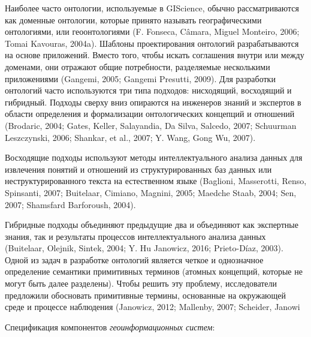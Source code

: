 Наиболее часто онтологии, используемые в GIScience, обычно рассматриваются как доменные онтологии, которые принято называть  географическими онтологиями, или геоонтологиями (F. Fonseca, Câmara,  Miguel Monteiro, 2006; Tomai Kavouras, 2004a). Шаблоны проектирования онтологий разрабатываются на основе приложений. Вместо того, чтобы искать соглашения внутри или между доменами, они отражают общие потребности, разделяемые несколькими приложениями (Gangemi, 2005; Gangemi Presutti, 2009).  
Для разработки онтологий часто используются три типа подходов: нисходящий, восходящий и гибридный. 
Подходы сверху вниз опираются на инженеров знаний и экспертов в области определения и формализации онтологических концепций и отношений (Brodaric, 2004; Gates, Keller, Salayandia, Da Silva, Salcedo, 2007; Schuurman Leszczynski, 2006; Shankar, et al., 2007; Y. Wang, Gong Wu, 2007). 

Восходящие подходы используют методы интеллектуального анализа данных для извлечения понятий и отношений из структурированных баз данных или неструктурированного текста на естественном языке (Baglioni, Masserotti, Renso, Spinsanti, 2007; Buitelaar, Cimiano, Magnini, 2005; Maedche  Staab, 2004; Sen, 2007; Shamsfard Barforoush, 2004). 

Гибридные подходы объединяют предыдущие два и объединяют как экспертные знания, так и результаты процессов интеллектуального анализа данных (Buitelaar, Olejnik, Sintek, 2004; Y. Hu Janowicz, 2016; Prieto-Díaz, 2003). Одной из задач в разработке онтологий является четкое и однозначное определение семантики примитивных терминов (атомных концепций, которые не могут быть далее разделены). Чтобы решить эту проблему, исследователи предложили обосновать примитивные термины, основанные на окружающей среде и процессе наблюдения (Janowicz, 2012; Mallenby, 2007; Scheider, Janowi

Спецификация компонентов \textit{геоинформационных систем}:

